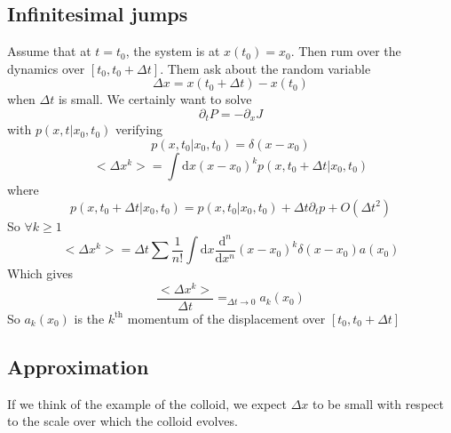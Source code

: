 \documentclass[a4paper]{book}
\theoremstyle{definition}
\theoremstyle{remark}
\begin{document}
\subsection{Infinitesimal jumps}
Assume that at $t=t_0$, the system is at $x(t_0) = x_0$. Then rum over the dynamics over $[t_0, t_0 + \Delta t]$. Them ask about the random variable 
\begin{equation}
    \Delta x = x(t_0 + \Delta t) - x(t_0)
\end{equation}
when $\Delta t$ is small. We certainly want to solve 
\begin{equation}
    \partial_t P = -\partial_x J
\end{equation}
with $p(x, t | x_0, t_0)$ verifying 
\begin{equation}
    p(x, t_0 | x_0, t_0) = \delta(x - x_0)
\end{equation}
\begin{equation}
    <\Delta x^k> = \int \text{d}x (x-x_0)^k p(x, t_0 + \Delta t | x_0, t_0)
\end{equation}
where 
\begin{equation}
    p(x, t_0 + \Delta t | x_0, t_0) = p(x, t_0 | x_0, t_0) + \Delta t \partial_t p + O(\Delta t^2)
\end{equation}
So $\forall k \geq 1$
\begin{equation}
    <\Delta x^k> = \Delta t \sum \frac{1}{n!}\int \text{d}x \frac{\text{d}^n}{\text{d}x^n} (x-x_0)^k \delta(x - x_0)a(x_0)
\end{equation}
Which gives 
\begin{equation}
    \frac{<\Delta x^k>}{\Delta t} =_{\Delta t \rightarrow 0} a_k(x_0)
\end{equation}
So $a_k(x_0)$ is the $k^{\text{th}}$ momentum of the displacement over $[t_0, t_0 + \Delta t]$ 

\subsection{Approximation}
If we think of the example of the colloid, we expect $\Delta x$ to be small with respect to the scale over which the colloid evolves. \par \medskip 
\end{document}
